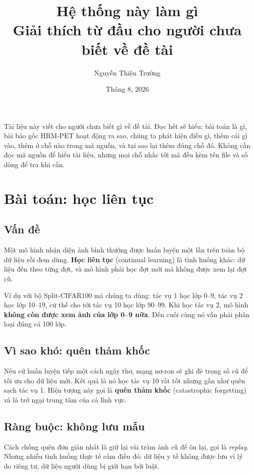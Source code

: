 \documentclass[11pt,a4paper]{article}
\title{\bfseries Hệ thống này làm gì\\[2pt]
\large\mdseries Giải thích từ đầu cho người chưa biết về đề tài}
\author{Nguyễn Thiện Trường}
\date{Tháng 8, 2026}
\begin{document}
\maketitle

\noindent
Tài liệu này viết cho người chưa biết gì về đề tài. Đọc hết sẽ hiểu: bài toán là
gì, bài báo gốc HRM-PET hoạt động ra sao, chúng ta phát hiện điều gì, thêm cái gì
vào, thêm ở chỗ nào trong mã nguồn, và tại sao lại thêm đúng chỗ đó. Không cần
đọc mã nguồn để hiểu tài liệu, nhưng mọi chỗ nhắc tới mã đều kèm tên file và số
dòng để tra khi cần.

\tableofcontents
\bigskip

\section{Bài toán: học liên tục}

\subsection{Vấn đề}

Một mô hình nhận diện ảnh bình thường được huấn luyện một lần trên toàn bộ dữ
liệu rồi đem dùng. \textbf{Học liên tục} (continual learning) là tình huống khác:
dữ liệu đến theo từng đợt, và mô hình phải học đợt mới mà không được xem lại đợt
cũ.

Ví dụ với bộ Split-CIFAR100 mà chúng ta dùng: tác vụ 1 học lớp 0--9, tác vụ 2 học
lớp 10--19, cứ thế cho tới tác vụ 10 học lớp 90--99. Khi học tác vụ 2, mô hình
\textbf{không còn được xem ảnh của lớp 0--9 nữa}. Đến cuối cùng nó vẫn phải phân
loại đúng cả 100 lớp.

\subsection{Vì sao khó: quên thảm khốc}

Nếu cứ huấn luyện tiếp một cách ngây thơ, mạng nơ-ron sẽ ghi đè trọng số cũ để
tối ưu cho dữ liệu mới. Kết quả là nó học tác vụ 10 rất tốt nhưng gần như quên
sạch tác vụ 1. Hiện tượng này gọi là \textbf{quên thảm khốc} (catastrophic
forgetting) và là trở ngại trung tâm của cả lĩnh vực.

\subsection{Ràng buộc: không lưu mẫu}

Cách chống quên đơn giản nhất là giữ lại vài trăm ảnh cũ để ôn lại, gọi là
\emph{replay}. Nhưng nhiều tình huống thực tế cấm điều đó: dữ liệu y tế không
được lưu vì lý do riêng tư, dữ liệu người dùng bị giới hạn bởi luật.
\end{document}
